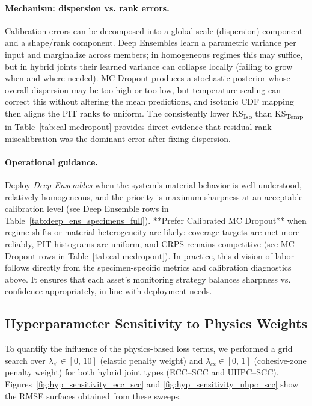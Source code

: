 \documentclass{article}
\begin{document}
\paragraph{Mechanism: dispersion vs. rank errors.} Calibration errors can be decomposed into a global scale (dispersion) component and a shape/rank component. Deep Ensembles learn a parametric variance per input and marginalize across members; in homogeneous regimes this may suffice, but in hybrid joints their learned variance can collapse locally (failing to grow when and where needed). MC Dropout produces a stochastic posterior whose overall dispersion may be too high or too low, but temperature scaling can correct this without altering the mean predictions, and isotonic CDF mapping then aligns the PIT ranks to uniform. The consistently lower KS\textsubscript{Iso} than KS\textsubscript{Temp} in Table~\ref{tab:cal-mcdropout} provides direct evidence that residual rank miscalibration was the dominant error after fixing dispersion.

\paragraph{Operational guidance.} Deploy \emph{Deep Ensembles} when the system’s material behavior is well-understood, relatively homogeneous, and the priority is maximum sharpness at an acceptable calibration level (see Deep Ensemble rows in Table~\ref{tab:deep_ens_specimens_full}). **Prefer Calibrated MC Dropout** when regime shifts or material heterogeneity are likely: coverage targets are met more reliably, PIT histograms are uniform, and CRPS remains competitive (see MC Dropout rows in Table~\ref{tab:cal-mcdropout}). In practice, this division of labor follows directly from the specimen-specific metrics and calibration diagnostics above. It ensures that each asset’s monitoring strategy balances sharpness vs. confidence appropriately, in line with deployment needs.


\subsection{Hyperparameter Sensitivity to Physics Weights}
\label{subsec:hyper}

To quantify the influence of the physics-based loss terms, we performed a grid search over $\lambda_{\text{el}} \in [0,\,10]$ (elastic penalty weight) and $\lambda_{\text{cz}} \in [0,\,1]$ (cohesive-zone penalty weight) for both hybrid joint types (ECC–SCC and UHPC–SCC). Figures~\ref{fig:hyp_sensitivity_ecc_scc} and \ref{fig:hyp_sensitivity_uhpc_scc} show the RMSE surfaces obtained from these sweeps.
\end{document}
